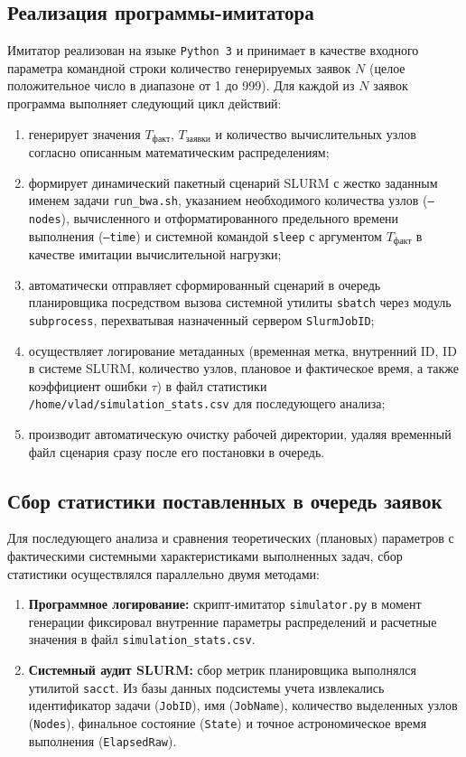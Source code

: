 \subsection{Реализация программы-имитатора}

Имитатор реализован на языке \texttt{Python 3} и принимает в качестве входного параметра командной строки количество генерируемых заявок $N$ (целое положительное число в диапазоне от 1 до 999). Для каждой из $N$ заявок программа выполняет следующий цикл действий:
\begin{enumerate}
\item генерирует значения $T_{\text{факт}}$, $T_{\text{заявки}}$ и количество вычислительных узлов согласно описанным математическим распределениям;
\item формирует динамический пакетный сценарий SLURM с жестко заданным именем задачи \texttt{run\_bwa.sh}, указанием необходимого количества узлов (\texttt{--nodes}), вычисленного и отформатированного предельного времени выполнения (\texttt{--time}) и системной командой \texttt{sleep} с аргументом $T_{\text{факт}}$ в качестве имитации вычислительной нагрузки;
\item автоматически отправляет сформированный сценарий в очередь планировщика посредством вызова системной утилиты \texttt{sbatch} через модуль \texttt{subprocess}, перехватывая назначенный сервером \texttt{SlurmJobID};
\item осуществляет логирование метаданных (временная метка, внутренний ID, ID в системе SLURM, количество узлов, плановое и фактическое время, а также коэффициент ошибки $\tau$) в файл статистики \texttt{/home/vlad/simulation\_stats.csv} для последующего анализа;
\item производит автоматическую очистку рабочей директории, удаляя временный файл сценария сразу после его постановки в очередь.
\end{enumerate}

\subsection{Сбор статистики поставленных в очередь заявок}

Для последующего анализа и сравнения теоретических (плановых) параметров с фактическими системными характеристиками выполненных задач, сбор статистики осуществлялся параллельно двумя методами:
\begin{enumerate}
\item \textbf{Программное логирование:} скрипт-имитатор \texttt{simulator.py} в момент генерации фиксировал внутренние параметры распределений и расчетные значения в файл \texttt{simulation\_stats.csv}.
\item \textbf{Системный аудит SLURM:} сбор метрик планировщика выполнялся утилитой \texttt{sacct}. Из базы данных подсистемы учета извлекались идентификатор задачи (\texttt{JobID}), имя (\texttt{JobName}), количество выделенных узлов (\texttt{Nodes}), финальное состояние (\texttt{State}) и точное астрономическое время выполнения (\texttt{ElapsedRaw}).
\end{enumerate}

